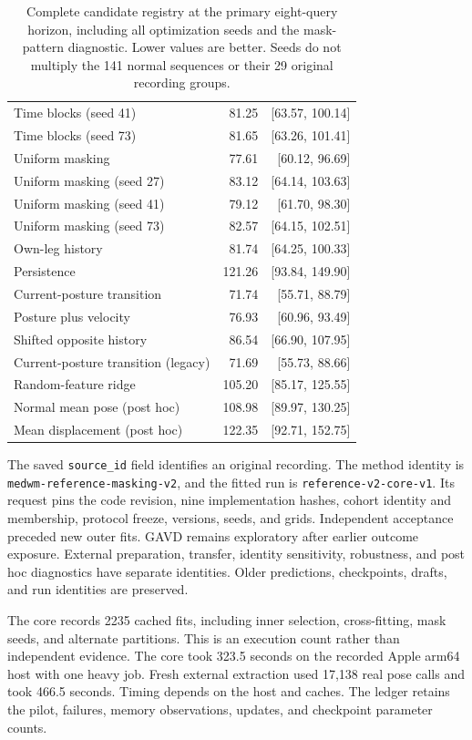 \documentclass[letterpaper]{article}
\begin{document}
\begin{table}[t]
\begin{tabular}{lrr}
Time blocks (seed 41) & 81.25 & [63.57, 100.14] \\
Time blocks (seed 73) & 81.65 & [63.26, 101.41] \\
Uniform masking & 77.61 & [60.12, 96.69] \\
Uniform masking (seed 27) & 83.12 & [64.14, 103.63] \\
Uniform masking (seed 41) & 79.12 & [61.70, 98.30] \\
Uniform masking (seed 73) & 82.57 & [64.15, 102.51] \\
Own-leg history & 81.74 & [64.25, 100.33] \\
Persistence & 121.26 & [93.84, 149.90] \\
Current-posture transition & 71.74 & [55.71, 88.79] \\
Posture plus velocity & 76.93 & [60.96, 93.49] \\
Shifted opposite history & 86.54 & [66.90, 107.95] \\
Current-posture transition (legacy) & 71.69 & [55.73, 88.66] \\
Random-feature ridge & 105.20 & [85.17, 125.55] \\
Normal mean pose (post hoc) & 108.98 & [89.97, 130.25] \\
Mean displacement (post hoc) & 122.35 & [92.71, 152.75] \\
\bottomrule
\end{tabular}
\caption{Complete candidate registry at the primary eight-query horizon, including all optimization seeds and the mask-pattern diagnostic. Lower values are better. Seeds do not multiply the 141 normal sequences or their 29 original recording groups.}
\label{tab:complete_forecasts}
\end{table}

The saved \texttt{source\_id} field identifies an original recording. The method identity is \texttt{medwm-reference-masking-v2}, and the fitted run is \texttt{reference-v2-core-v1}. Its request pins the code revision, nine implementation hashes, cohort identity and membership, protocol freeze, versions, seeds, and grids. Independent acceptance preceded new outer fits. GAVD remains exploratory after earlier outcome exposure. External preparation, transfer, identity sensitivity, robustness, and post hoc diagnostics have separate identities. Older predictions, checkpoints, drafts, and run identities are preserved.

The core records 2235 cached fits, including inner selection, cross-fitting, mask seeds, and alternate partitions. This is an execution count rather than independent evidence. The core took 323.5 seconds on the recorded Apple arm64 host with one heavy job. Fresh external extraction used 17,138 real pose calls and took 466.5 seconds. Timing depends on the host and caches. The ledger retains the pilot, failures, memory observations, updates, and checkpoint parameter counts.
\end{document}

